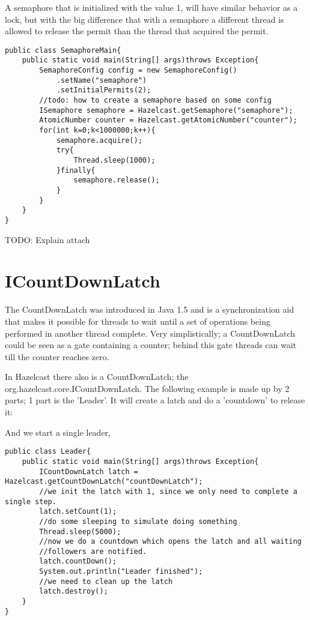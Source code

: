 A semaphore that is initialized with the value 1, will have similar behavior as a lock,
but with the big difference that with a semaphore a different thread is allowed to release
the permit than the thread that acquired the permit.

\begin{verbatim}
public class SemaphoreMain{
    public static void main(String[] args)throws Exception{
        SemaphoreConfig config = new SemaphoreConfig()
            .setName("semaphore")
            .setInitialPermits(2);
        //todo: how to create a semaphore based on some config
        ISemaphore semaphore = Hazelcast.getSemaphore("semaphore");
        AtomicNumber counter = Hazelcast.getAtomicNumber("counter");
        for(int k=0;k<1000000;k++){
            semaphore.acquire();
            try{
                Thread.sleep(1000);
            }finally{
                semaphore.release();
            }
        }
    }
}
\end{verbatim}

TODO: Explain attach

\section{ICountDownLatch}
The CountDownLatch was introduced in Java 1.5 and is a synchronization aid that makes it
possible for threads to wait until a set of operations being performed in another thread 
complete. Very simplistically; a CountDownLatch could be seen as a gate containing a counter;
behind this gate threads can wait till the counter reaches zero. 

In Hazelcast there also is a CountDownLatch; the org.hazelcast.core.ICountDownLatch. 
The following example is made up by 2 parts; 1 part is the 'Leader'. It will create a latch
and do a 'countdown' to release it:

And we start a single leader, 
\begin{verbatim}
public class Leader{
    public static void main(String[] args)throws Exception{
        ICountDownLatch latch = Hazelcast.getCountDownLatch("countDownLatch");
        //we init the latch with 1, since we only need to complete a single step.
        latch.setCount(1); 
        //do some sleeping to simulate doing something    
        Thread.sleep(5000);
        //now we do a countdown which opens the latch and all waiting
        //followers are notified.
        latch.countDown();
        System.out.println("Leader finished");
        //we need to clean up the latch
        latch.destroy();
    }
}
\end{verbatim}

